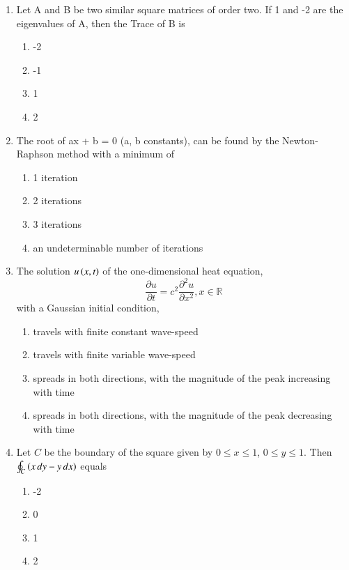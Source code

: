 \documentclass[journal,9pt,onecolumn]{IEEEtran}
\begin{document}
\begin{enumerate}


\item Let A and B be two similar square matrices of order two. If 1 and -2 are the eigenvalues of A, then the Trace of B is
\begin{multicols}{4}    
\begin{enumerate}
     \item -2
     \item -1
     \item 1
     \item 2
\end{enumerate}
\end{multicols}

\item The root of ax + b = 0 (a, b constants), can be found by the Newton-Raphson method with a minimum of
\begin{multicols}{2}
\begin{enumerate}
    \item 1 iteration
    \item 2 iterations
    \item 3 iterations
    \item an undeterminable number of iterations
\end{enumerate}
\end{multicols}


\item  The solution $u\left(x,t\right)$ of the one-dimensional heat equation, 
$$\frac{\partial u}{\partial t} = c^2 \frac{\partial^2 u}{\partial x^2},x\in \mathbb{R}$$ with a Gaussian initial condition,
\begin{enumerate}
    \item  travels with finite constant wave-speed
    \item  travels with finite variable wave-speed
    \item  spreads in both directions, with the magnitude of the peak increasing with time
    \item  spreads in both directions, with the magnitude of the peak decreasing with time
\end{enumerate}


\item  Let $C$ be the boundary of the square given by $0 \leq x \leq 1$, $0 \leq y \leq 1$. Then $\oint_C \left(x \, dy - y \, dx\right)$ equals  
\begin{multicols}{4}    
\begin{enumerate}
    \item -2
    \item 0
    \item 1
    \item 2
\end{enumerate}
\end{multicols}



\end{enumerate}
\end{document}
